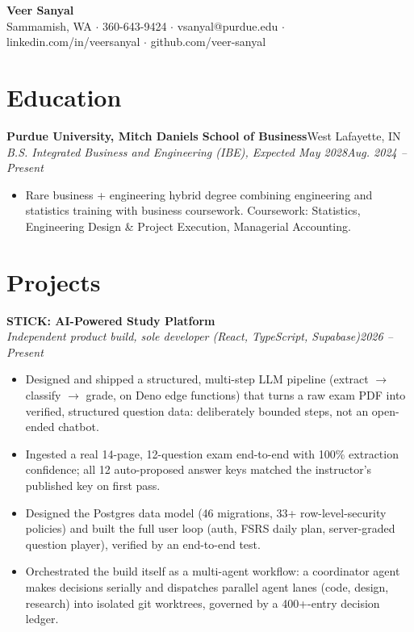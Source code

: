 \documentclass[10pt,letterpaper]{article}
\newcommand{\entry}[4]{%
  \textbf{#1}\hfill #2\\[1pt]
  \textit{#3}\hfill \textit{#4}\\[2pt]
}
\begin{document}
\begin{center}
  {\LARGE \textbf{Veer Sanyal}}\\[3pt]
  Sammamish, WA $\cdot$ 360-643-9424 $\cdot$ vsanyal@purdue.edu $\cdot$ linkedin.com/in/veersanyal $\cdot$ github.com/veer-sanyal
\end{center}

\section*{Education}
\textbf{Purdue University, Mitch Daniels School of Business}\hfill West Lafayette, IN\\[1pt]
\textit{B.S. Integrated Business and Engineering (IBE), Expected May 2028}\hfill \textit{Aug. 2024 -- Present}
\begin{itemize}
  \item Rare business + engineering hybrid degree combining engineering and statistics training with business coursework. Coursework: Statistics, Engineering Design \& Project Execution, Managerial Accounting.
\end{itemize}

\section*{Projects}
\entry{STICK: AI-Powered Study Platform}{}{Independent product build, sole developer (React, TypeScript, Supabase)}{2026 -- Present}
\begin{itemize}
  \item Designed and shipped a structured, multi-step LLM pipeline (extract $\to$ classify $\to$ grade, on Deno edge functions) that turns a raw exam PDF into verified, structured question data: deliberately bounded steps, not an open-ended chatbot.
  \item Ingested a real 14-page, 12-question exam end-to-end with 100\% extraction confidence; all 12 auto-proposed answer keys matched the instructor's published key on first pass.
  \item Designed the Postgres data model (46 migrations, 33+ row-level-security policies) and built the full user loop (auth, FSRS daily plan, server-graded question player), verified by an end-to-end test.
  \item Orchestrated the build itself as a multi-agent workflow: a coordinator agent makes decisions serially and dispatches parallel agent lanes (code, design, research) into isolated git worktrees, governed by a 400+-entry decision ledger.
\end{itemize}
\end{document}
